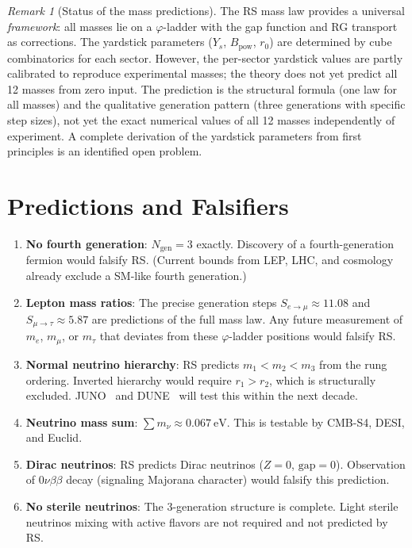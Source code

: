 \documentclass[12pt,a4paper]{article}
\theoremstyle{definition}
\theoremstyle{remark}
\newtheorem{remark}[theorem]{Remark}
\begin{document}
\begin{remark}[Status of the mass predictions]
The RS mass law provides a universal \emph{framework}: all masses lie
on a $\varphi$-ladder with the gap function and RG transport as
corrections.  The yardstick parameters ($Y_s$, $B_{\mathrm{pow}}$,
$r_0$) are determined by cube combinatorics for each sector.
However, the per-sector yardstick values are partly calibrated to
reproduce experimental masses; the theory does not yet predict all
12 masses from zero input.  The prediction is the structural formula
(one law for all masses) and the qualitative generation pattern
(three generations with specific step sizes), not yet the exact numerical
values of all 12 masses independently of experiment.  A complete
derivation of the yardstick parameters from first principles is an
identified open problem.
\end{remark}

\section{Predictions and Falsifiers}
\label{sec:predictions}

\begin{enumerate}
  \item \textbf{No fourth generation}: $N_{\mathrm{gen}} = 3$
  exactly.  Discovery of a fourth-generation fermion would
  falsify RS.  (Current bounds from LEP, LHC, and cosmology
  already exclude a SM-like fourth generation.)

  \item \textbf{Lepton mass ratios}: The precise generation
  steps $S_{e \to \mu} \approx 11.08$ and
  $S_{\mu \to \tau} \approx 5.87$ are predictions of the full
  mass law.  Any future measurement of $m_e$, $m_\mu$, or
  $m_\tau$ that deviates from these $\varphi$-ladder positions
  would falsify RS.

  \item \textbf{Normal neutrino hierarchy}: RS predicts
  $m_1 < m_2 < m_3$ from the rung ordering.  Inverted
  hierarchy would require $r_1 > r_2$, which is structurally
  excluded.  JUNO~\cite{JUNO} and DUNE~\cite{DUNE} will test
  this within the next decade.

  \item \textbf{Neutrino mass sum}: $\sum m_\nu \approx
  0.067~\mathrm{eV}$.  This is testable by CMB-S4, DESI,
  and Euclid.

  \item \textbf{Dirac neutrinos}: RS predicts Dirac neutrinos
  ($Z = 0$, $\mathrm{gap} = 0$).  Observation of
  $0\nu\beta\beta$ decay (signaling Majorana character) would
  falsify this prediction.

  \item \textbf{No sterile neutrinos}: The 3-generation
  structure is complete.  Light sterile neutrinos mixing with
  active flavors are not required and not predicted by RS.
\end{enumerate}
\end{document}
